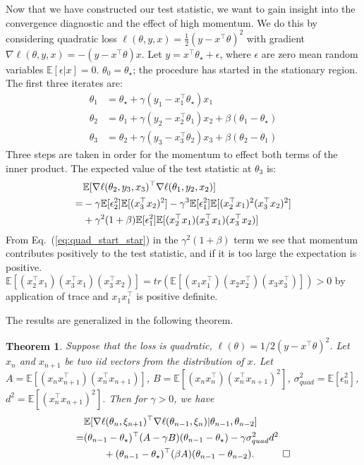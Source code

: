 \documentclass[conference]{IEEEtran}
\newcommand{\Ex}[1]{\mathbb{E}[ #1 ]}
\newtheorem{theorem}{Theorem}
\begin{document}
Now that we have constructed our test statistic, we want to gain insight into the convergence diagnostic and the effect of high momentum.
We do this by considering quadratic loss $\ell ( \theta, y, x ) = \frac{1}{2} ( y - x^\top \theta )^2$ with gradient $\nabla \ell ( \theta, y, x ) = - ( y - x^\top \theta) x$.
Let $y = x^\top \theta_\star + \epsilon$, where $\epsilon$ are zero mean random variables $\Ex{ \epsilon | x } = 0$. $\theta_0 = \theta_\star$; the procedure has started in the stationary region.
The first three iterates are:
\begin{align*}
\theta_1 &= \theta_\star + \gamma ( y_1 - x_1^\top \theta_\star ) x_1 \\
\theta_2 &= \theta_1 + \gamma ( y_2 - x_2^\top \theta_1 ) x_2 + \beta ( \theta_1 - \theta_\star ) \\
\theta_3 &= \theta_2 + \gamma ( y_3 - x_3^\top \theta_2 ) x_3 + \beta ( \theta_2 - \theta_1 )
\end{align*}
Three steps are taken in order for the momentum to effect both terms of the inner product.
The expected value of the test statistic at $\theta_3$ is:
\begin{align}\notag
&\Ex{ \nabla \ell ( \theta_2, y_3, x_3 )^\top \nabla \ell ( \theta_1, y_2, x_2 ) }  \\
=& - \gamma \Ex{ \epsilon_2^2 } \Ex{ ( x_3^\top x_2 )^2 } - \gamma^3 \Ex { \epsilon_1^2 } \Ex { ( x_2^\top x_1 )^2 ( x_3^\top x_2 )^2 } \nonumber \\\label{eq:quad_start_star}
& + \gamma^2 ( 1 + \beta ) \Ex{ \epsilon_1^2 } \Ex{ ( x_2^\top x_1 ) ( x_3^\top x_1 ) ( x_3^\top x_2 ) } 
\end{align}
From Eq.~(\ref{eq:quad_start_star}) in the $\gamma^2 (1+\beta)$ term we see that momentum contributes positively to the test statistic, and if it is too large the expectation is positive.  $\Ex{ ( x_2^\top x_1 ) ( x_3^\top x_1 ) ( x_3^\top x_2 ) } = tr( \Ex{(x_1 x_1^\top) (x_2 x_2^\top) (x_3 x_3^\top) } ) > 0$ by application of trace and $x_1 x_1^\top$ is positive definite.

The results are generalized in the following theorem. 
\begin{theorem}
\label{thm:quad_diag}
Suppose that the loss is quadratic, $\ell ( \theta ) = 1/2 ( y - x^\top \theta )^2$. 
Let $x_n$ and $x_{n+1}$ be two iid vectors from the distribution of $x$.
Let $A = \Ex{ ( x_n x_{n+1}^\top ) ( x_n^\top x_{n+1} ) }$, $B = \Ex{ ( x_{n} x_n^\top ) ( x_n^\top x_{n+1} )^2 }$, $\sigma_{quad}^2 = \Ex { \epsilon_n^2 }$, $d^2 = \Ex{ ( x_n^\top x_{n+1} )^2 }$.
Then for $\gamma > 0$, we have
\begin{align}\notag
&\Ex{ \nabla \ell ( \theta_n, \xi_{n+1} )^\top \nabla \ell ( \theta_{n-1}, \xi_n ) |  \theta_{n-1}, \theta_{n-2} } \\\notag
=& ( \theta_{n-1} - \theta_\star )^\top ( A - \gamma B) ( \theta_{n-1} - \theta_\star )
- \gamma \sigma_{quad}^2 d^2 \\\notag
&\quad\quad + ( \theta_{n-1} - \theta_\star )^\top ( \beta A ) ( \theta_{n-1} - \theta_{n-2} ).\hspace{0.4in} \Box
\end{align}
\end{theorem}
\end{document}
